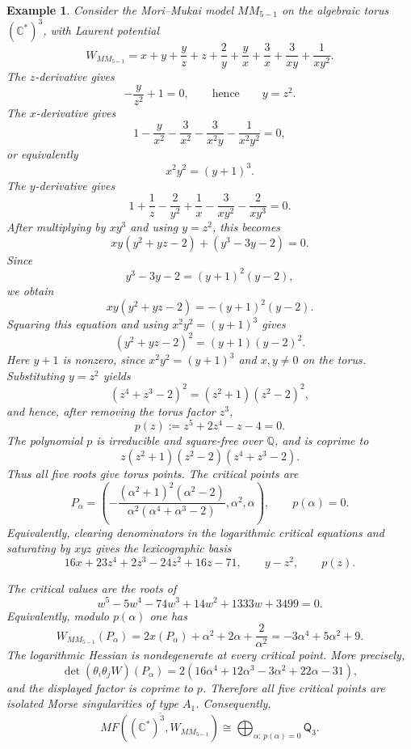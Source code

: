\documentclass[11pt]{amsart}
\newtheorem{example}{Example}[section]
\newcommand{\MorseCat}[1]{\mathsf{Q}_{#1}}
\begin{document}
\begin{example}
Consider the Mori--Mukai model $MM_{5-1}$ on the algebraic torus
$(\mathbb{C}^*)^3$, with Laurent potential
\[
W_{MM_{5-1}}=x+y+\frac{y}{z}+z+\frac{2}{y}
+\frac{y}{x}+\frac{3}{x}+\frac{3}{xy}+\frac{1}{xy^2}.
\]
The $z$-derivative gives
\[
-\frac{y}{z^2}+1=0,
\qquad\text{hence}\qquad
y=z^2.
\]
The $x$-derivative gives
\[
1-\frac{y}{x^2}-\frac{3}{x^2}-\frac{3}{x^2y}
-\frac{1}{x^2y^2}=0,
\]
or equivalently
\[
x^2y^2=(y+1)^3.
\]
The $y$-derivative gives
\[
1+\frac{1}{z}-\frac{2}{y^2}+\frac{1}{x}
-\frac{3}{xy^2}-\frac{2}{xy^3}=0.
\]
After multiplying by $xy^3$ and using $y=z^2$, this becomes
\[
xy(y^2+yz-2)+(y^3-3y-2)=0.
\]
Since
\[
y^3-3y-2=(y+1)^2(y-2),
\]
we obtain
\[
xy(y^2+yz-2)=-(y+1)^2(y-2).
\]
Squaring this equation and using $x^2y^2=(y+1)^3$ gives
\[
(y^2+yz-2)^2=(y+1)(y-2)^2.
\]
Here $y+1$ is nonzero, since $x^2y^2=(y+1)^3$ and $x,y\neq0$ on the torus.
Substituting $y=z^2$ yields
\[
(z^4+z^3-2)^2=(z^2+1)(z^2-2)^2,
\]
and hence, after removing the torus factor $z^3$,
\[
p(z):=z^5+2z^4-z-4=0.
\]
The polynomial $p$ is irreducible and square-free over $\mathbb{Q}$, and is
coprime to
\[
z(z^2+1)(z^2-2)(z^4+z^3-2).
\]
Thus all five roots give torus points. The critical points are
\[
P_\alpha=\left(
-\frac{(\alpha^2+1)^2(\alpha^2-2)}{\alpha^2(\alpha^4+\alpha^3-2)},
\alpha^2,
\alpha
\right),
\qquad
p(\alpha)=0.
\]
Equivalently, clearing denominators in the logarithmic critical equations and
saturating by $xyz$ gives the lexicographic basis
\[
16x+23z^4+2z^3-24z^2+16z-71,
\qquad
y-z^2,
\qquad
p(z).
\]

The critical values are the roots of
\[
w^5-5w^4-74w^3+14w^2+1333w+3499=0.
\]
Equivalently, modulo $p(\alpha)$ one has
\[
W_{MM_{5-1}}(P_\alpha)
=2x(P_\alpha)+\alpha^2+2\alpha+\frac{2}{\alpha^2}
=-3\alpha^4+5\alpha^2+9.
\]
The logarithmic Hessian is nondegenerate at every critical point. More
precisely,
\[
\det(\theta_i\theta_jW)(P_\alpha)
=2(16\alpha^4+12\alpha^3-3\alpha^2+22\alpha-31),
\]
and the displayed factor is coprime to $p$. Therefore all five critical points
are isolated Morse singularities of type $A_1$. Consequently,
\[
\overline{MF((\mathbb{C}^*)^3,W_{MM_{5-1}})}
\cong \bigoplus_{\alpha:\,p(\alpha)=0}\MorseCat{3}.
\]
\end{example}
\end{document}
